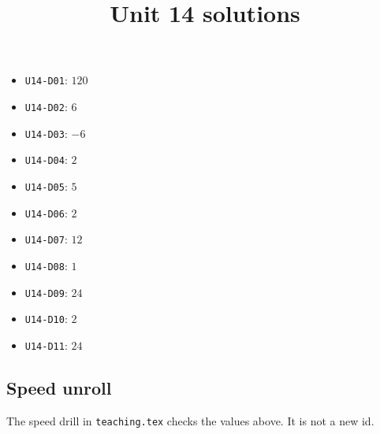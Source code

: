 
\title{Unit 14 solutions}

\maketitle
\begin{itemize}
  \item \texttt{U14-D01}: $120$
  \item \texttt{U14-D02}: $6$
  \item \texttt{U14-D03}: $-6$
  \item \texttt{U14-D04}: $2$
  \item \texttt{U14-D05}: $5$
  \item \texttt{U14-D06}: $2$
  \item \texttt{U14-D07}: $12$
  \item \texttt{U14-D08}: $1$
  \item \texttt{U14-D09}: $24$
  \item \texttt{U14-D10}: $2$
  \item \texttt{U14-D11}: $24$
\end{itemize}
\subsection*{Speed unroll}
The speed drill in \texttt{teaching.tex} checks the values above. It is not a new id.

